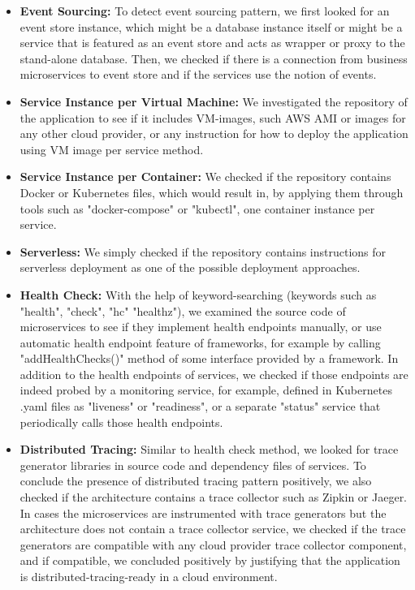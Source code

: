 \documentclass{Configuration_Files/PoliMi3i_thesis}
\begin{document}
\begin{itemize}
    \item \textbf{Event Sourcing:} To detect event sourcing pattern, we first looked for an event store instance, which might be a database instance itself or might be a service that is featured as an event store and acts as wrapper or proxy to the stand-alone database.
    Then, we checked if there is a connection from business microservices to event store and if the services use the notion of events.
    
    \item \textbf{Service Instance per Virtual Machine:} We investigated the repository of the application to see if it includes VM-images, such AWS AMI or images for any other cloud provider, or any instruction for how to deploy the application using VM image per service method.
    
    \item \textbf{Service Instance per Container:} We checked if the repository contains Docker or Kubernetes files, which would result in, by applying them through tools such as "docker-compose" or "kubectl", one container instance per service.
    
    \item \textbf{Serverless:} We simply checked if the repository contains instructions for serverless deployment as one of the possible deployment approaches.
    
    \item \textbf{Health Check:} With the help of keyword-searching (keywords such as "health", "check", "hc" "healthz"), we examined the source code of microservices to see if they implement health endpoints manually, or use automatic health endpoint feature of frameworks, for example by calling "addHealthChecks()" method of some interface provided by a framework.
    In addition to the health endpoints of services, we checked if those endpoints are indeed probed by a monitoring service, for example, defined in Kubernetes .yaml files as "liveness" or "readiness", or a separate "status" service that periodically calls those health endpoints.
    
    \item \textbf{Distributed Tracing:} Similar to health check method, we looked for trace generator libraries in source code and dependency files of services.
    To conclude the presence of distributed tracing pattern positively, we also checked if the architecture contains a trace collector such as Zipkin or Jaeger.
    In cases the microservices are instrumented with trace generators but the architecture does not contain a trace collector service, we checked if the trace generators are compatible with any cloud provider trace collector component, and if compatible, we concluded positively by justifying that the application is distributed-tracing-ready in a cloud environment.
    

\end{itemize}
\end{document}
